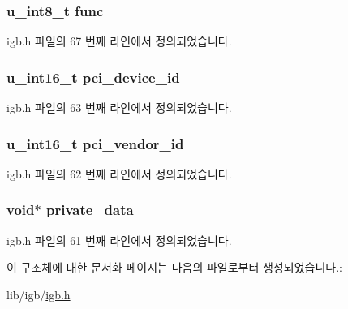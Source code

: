 \subsubsection[{\texorpdfstring{func}{func}}]{\setlength{\rightskip}{0pt plus 5cm}u\+\_\+int8\+\_\+t func}\hypertarget{struct__device__t_ab8989866a7c8f056e7d5bf6a24d80c57}{}\label{struct__device__t_ab8989866a7c8f056e7d5bf6a24d80c57}


igb.\+h 파일의 67 번째 라인에서 정의되었습니다.

\subsubsection[{\texorpdfstring{pci\+\_\+device\+\_\+id}{pci_device_id}}]{\setlength{\rightskip}{0pt plus 5cm}u\+\_\+int16\+\_\+t pci\+\_\+device\+\_\+id}\hypertarget{struct__device__t_a779b4e4fce4f634938e41a308e6a7a19}{}\label{struct__device__t_a779b4e4fce4f634938e41a308e6a7a19}


igb.\+h 파일의 63 번째 라인에서 정의되었습니다.

\subsubsection[{\texorpdfstring{pci\+\_\+vendor\+\_\+id}{pci_vendor_id}}]{\setlength{\rightskip}{0pt plus 5cm}u\+\_\+int16\+\_\+t pci\+\_\+vendor\+\_\+id}\hypertarget{struct__device__t_acf35ed7d091ed0ee4ff208efe53a64bf}{}\label{struct__device__t_acf35ed7d091ed0ee4ff208efe53a64bf}


igb.\+h 파일의 62 번째 라인에서 정의되었습니다.

\subsubsection[{\texorpdfstring{private\+\_\+data}{private_data}}]{\setlength{\rightskip}{0pt plus 5cm}void$\ast$ private\+\_\+data}\hypertarget{struct__device__t_ad517770dac2061381b2008850ff12e6c}{}\label{struct__device__t_ad517770dac2061381b2008850ff12e6c}


igb.\+h 파일의 61 번째 라인에서 정의되었습니다.



이 구조체에 대한 문서화 페이지는 다음의 파일로부터 생성되었습니다.\+:\begin{DoxyCompactItemize}
\item 
lib/igb/\hyperlink{lib_2igb_2igb_8h}{igb.\+h}\end{DoxyCompactItemize}
